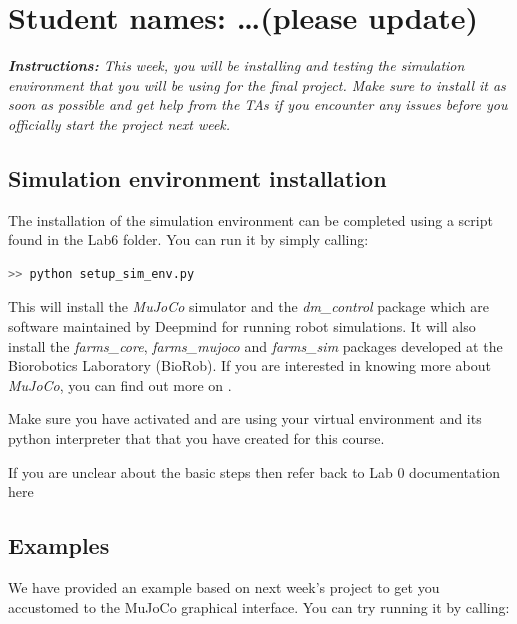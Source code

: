\documentclass{cmc}
\begin{document}
\pagestyle{fancy}
 

\section*{Student names: \ldots (please update)}

\textit{\textbf{Instructions:} This week, you will be installing and testing the
  simulation environment that you will be using for the final project. Make sure
  to install it as soon as possible and get help from the TAs if you encounter
  any issues before you officially start the project next week.}

\subsection*{Simulation environment installation}

The installation of the simulation environment can be completed using a script
found in the Lab6 folder. You can run it by simply calling:

\label{sec:mujoco-inst}
\begin{lstlisting}[language=Bash]
  >> python setup_sim_env.py
\end{lstlisting}

This will install the \textit{MuJoCo} simulator and the \textit{dm\_control}
package which are software maintained by Deepmind for running robot
simulations. It will also install the \textit{farms\_core},
\textit{farms\_mujoco} and \textit{farms\_sim} packages developed at the
Biorobotics Laboratory (BioRob). If you are interested in knowing more about
\textit{MuJoCo}, you can find out more on \href{https://mujoco.org/}{}.

 Make sure you have activated and are using your
virtual environment and its python interpreter that that you have created for
this course.

 If you are unclear about the basic steps then refer back
to Lab 0 documentation here
\href{https://farmsim.gitlab.io/courses/cmc-2022/}{}


\subsection*{Examples}
We have provided an example based on next week's project to get you accustomed
to the MuJoCo graphical interface. You can try running it by calling:
\end{document}
